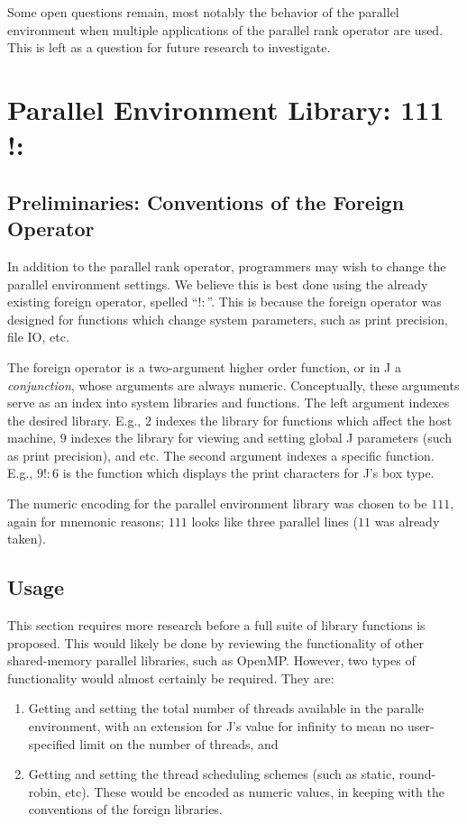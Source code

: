 Some open questions remain, most notably 
the behavior of the parallel environment when multiple applications of the parallel rank operator are used. 
This is left as a question for future research to investigate.

\section{Parallel Environment Library: 111 !:} 
\label{pfor}
\subsection{Preliminaries: Conventions of the Foreign Operator}
In addition to the parallel rank operator, 
programmers may wish to change the parallel environment settings.
We believe this is best done using the already existing foreign operator, spelled ``$!:$''.
This is because the foreign operator was designed for functions which change system parameters, 
such as print precision, file IO, etc.\cite{jvocab} 

The foreign operator is a two-argument higher order function, or in J a \textit{conjunction}, 
whose arguments are always numeric.
Conceptually, these arguments serve as an index into system libraries and functions.
The left argument indexes the desired library.
E.g., $2$ indexes the library for functions which affect the host machine, 
$9$ indexes the library for viewing and setting global J parameters (such as print precision), and etc.
The second argument indexes a specific function.
E.g., $9!:6$ is the function which displays the print characters for J's box type.

The numeric encoding for the parallel environment library 
was chosen to be $111$, again for mnemonic reasons; 
$111$ looks like three parallel lines ($11$ was already taken).

\subsection{Usage}
This section requires more research before a full suite of library functions is proposed.
This would likely be done by reviewing the functionality of other shared-memory parallel libraries, such as OpenMP. %
However, two types of functionality would almost certainly be required.
They are:

\begin{enumerate}
    \item Getting and setting the total number of threads available in the paralle environment,
        with an extension for J's value for infinity to mean no user-specified limit on the number of threads, and
    \item Getting and setting the thread scheduling schemes (such as static, round-robin, etc).
        These would be encoded as numeric values, in keeping with the conventions of the foreign libraries.
\end{enumerate}


